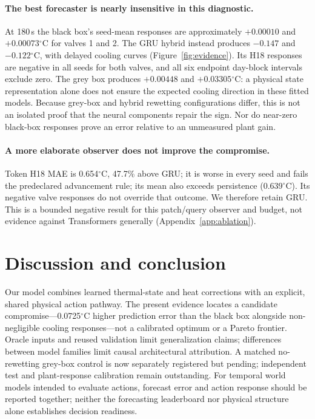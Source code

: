 \documentclass{article}
\newcommand{\degc}{\ensuremath{^{\circ}\mathrm{C}}}
\begin{document}
\paragraph{The best forecaster is nearly insensitive in this diagnostic.}
At 180\,s the black box's seed-mean responses are approximately
$+0.00010$ and $+0.00073$\degc{} for valves 1 and 2. The GRU hybrid instead
produces $-0.147$ and $-0.122$\degc{}, with delayed cooling curves
(Figure~\ref{fig:evidence}). Its H18 responses are negative in all seeds for
both valves, and all six endpoint day-block intervals exclude zero. The grey
box produces $+0.00448$ and $+0.03305$\degc{}: a physical state representation
alone does not ensure the expected cooling direction in these fitted models.
Because grey-box and hybrid rewetting configurations differ, this is not an
isolated proof that the neural components repair the sign. Nor do near-zero
black-box responses prove an error relative to an unmeasured plant gain.

\paragraph{A more elaborate observer does not improve the compromise.}
Token H18 MAE is 0.654\degc{}, 47.7\% above GRU; it is worse in every seed and
fails the predeclared advancement rule; its mean also exceeds persistence (0.639\degc{}). Its negative valve responses do not
override that outcome. We therefore retain GRU. This is a bounded negative
result for this patch/query observer and budget, not evidence against
Transformers generally (Appendix~\ref{app:ablation}).

\section{Discussion and conclusion}
Our model combines learned thermal-state and heat corrections with an explicit,
shared physical action pathway. The present evidence locates a candidate
compromise---0.0725\degc{} higher prediction error than the black box alongside
non-negligible cooling responses---not a calibrated optimum or a Pareto frontier.
Oracle inputs and reused validation limit generalization claims; differences
between model families limit causal architectural attribution. A matched
no-rewetting grey-box control is now separately registered but pending;
independent test and plant-response calibration remain outstanding.
For temporal world models intended to evaluate actions, forecast error and
action response should be reported together; neither the forecasting leaderboard
nor physical structure alone establishes decision readiness.

\label{maintext:end}
\clearpage


\clearpage
\appendix

\end{document}
